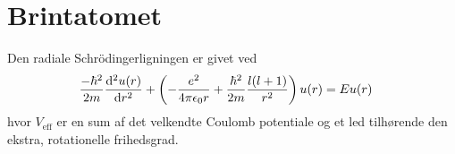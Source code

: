 \section{Brintatomet}
Den radiale Schrödingerligningen er givet ved \cite[s. 140]{griffiths}
%
\begin{align}
    \frac{-\hbar^{2}}{2m}\diff[2]{u(r)}{r} + \left( - \frac{e^{2}}{4\pi\epsilon_{0}r} + \frac{\hbar^{2}}{2m}\frac{l(l+1)}{r^{2}} \right)u(r) & \nonumber = Eu(r)
    \label{eq:schroedinger3d}
\end{align}
%
hvor $V_{\text{eff}}$ er en sum af det velkendte Coulomb potentiale og et led tilhørende den ekstra, rotationelle frihedsgrad.

%

